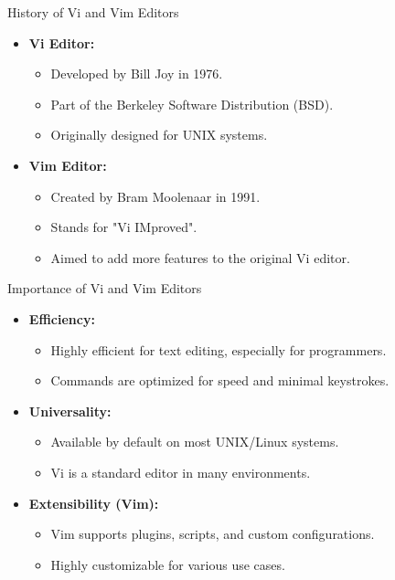 \documentclass[aspectratio=169]{beamer}
\begin{document}
\begin{frame}{History of Vi and Vim Editors}
    \begin{itemize}
        \item \textbf{Vi Editor:} 
        \begin{itemize}
            \item Developed by Bill Joy in 1976.
            \item Part of the Berkeley Software Distribution (BSD).
            \item Originally designed for UNIX systems.
        \end{itemize}
        \item \textbf{Vim Editor:} 
        \begin{itemize}
            \item Created by Bram Moolenaar in 1991.
            \item Stands for "Vi IMproved".
            \item Aimed to add more features to the original Vi editor.
        \end{itemize}
    \end{itemize}
\end{frame}

\begin{frame}{Importance of Vi and Vim Editors}
    \begin{itemize}
        \item \textbf{Efficiency:} 
        \begin{itemize}
            \item Highly efficient for text editing, especially for programmers.
            \item Commands are optimized for speed and minimal keystrokes.
        \end{itemize}
        \item \textbf{Universality:} 
        \begin{itemize}
            \item Available by default on most UNIX/Linux systems.
            \item Vi is a standard editor in many environments.
        \end{itemize}
        \item \textbf{Extensibility (Vim):} 
        \begin{itemize}
            \item Vim supports plugins, scripts, and custom configurations.
            \item Highly customizable for various use cases.
        \end{itemize}
    \end{itemize}
\end{frame}
\end{document}
